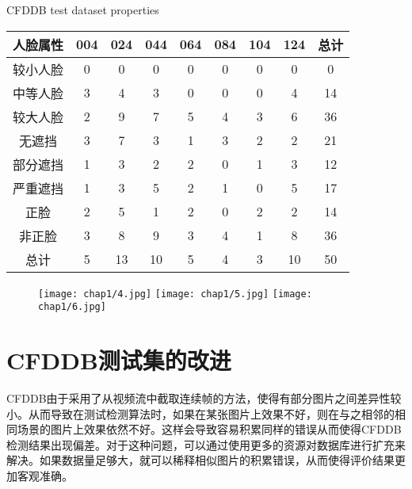 \begin{table}[!hpb]
	\centering
	{CFDDB test dataset properties}
	\label{tab:cfddbal}
	\begin{tabular}{ c | ccccccc | c }
		\hline
		人脸属性 & 004 & 024 & 044 & 064 & 084 & 104 & 124 & 总计\\
		\hline
		较小人脸 & 0 & 0 & 0 & 0 & 0 & 0 & 0 & 0\\
		中等人脸 & 3 & 4 & 3 & 0 & 0 & 0 & 4 & 14\\
		较大人脸 & 2 & 9 & 7 & 5 & 4 & 3 & 6 & 36\\
		无遮挡   & 3 & 7 & 3 & 1 & 3 & 2 & 2 & 21\\
		部分遮挡 & 1 & 3 & 2 & 2 & 0 & 1 & 3 & 12\\
		严重遮挡 & 1 & 3 & 5 & 2 & 1 & 0 & 5 & 17\\
		正脸     & 2 & 5 & 1 & 2 & 0 & 2 & 2 & 14\\
		非正脸   & 3 & 8 & 9 & 3 & 4 & 1 & 8 & 36\\
		\hline
		总计 & 5 & 13 & 10 & 5 & 4 & 3 & 10 & 50\\
		\hline
	\end{tabular}
\end{table}

\begin{figure}[!htp]
	\centering
	{\texttt{[image: chap1/4.jpg]}}
	\hspace{4em}
	{\texttt{[image: chap1/5.jpg]}}
	\hspace{4em}
	{\texttt{[image: chap1/6.jpg]}}
	\label{fig:cfddbeval}
\end{figure}

\section{CFDDB测试集的改进}

CFDDB由于采用了从视频流中截取连续帧的方法，使得有部分图片之间差异性较小。从而导致在测试检测算法时，如果在某张图片上效果不好，则在与之相邻的相同场景的图片上效果依然不好。这样会导致容易积累同样的错误从而使得CFDDB检测结果出现偏差。对于这种问题，可以通过使用更多的资源对数据库进行扩充来解决。如果数据量足够大，就可以稀释相似图片的积累错误，从而使得评价结果更加客观准确。

